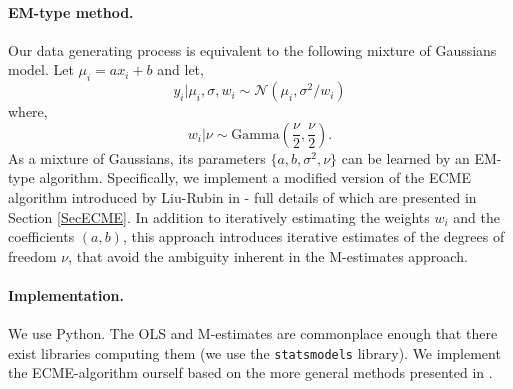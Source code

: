 \documentclass[11pt, a4 paper]{article}
\begin{document}
%

\paragraph{EM-type method.} Our data generating process is equivalent to the following mixture of Gaussians model. Let $\mu_i = ax_i + b$ and let,
\[
y_i | \mu_i, \sigma, w_i \sim \mathcal{N}\left(\mu_i, \sigma^2/w_i\right)
\]
where,
\[
w_i | \nu \sim \mbox{Gamma}\left(\frac{\nu}{2}, \frac{\nu}{2}\right).
\]
As a mixture of Gaussians, its parameters $\{a, b, \sigma^2, \nu\}$ can be learned by an EM-type algorithm. Specifically, we implement a modified version of the ECME algorithm introduced by Liu-Rubin in \cite{LiuRubin} - full details of which are presented in Section \ref{SecECME}. In addition to iteratively estimating the weights $w_i$ and the coefficients $(a, b)$, this approach introduces iterative estimates of the degrees of freedom $\nu$, that avoid the ambiguity inherent in the M-estimates approach.


\paragraph{Implementation.} We use Python. The OLS and M-estimates are commonplace enough that there exist libraries computing them (we use the  \texttt{statsmodels} library). We implement the ECME-algorithm ourself based on the more general methods presented in \cite{LiuRubin}.\\
\end{document}
